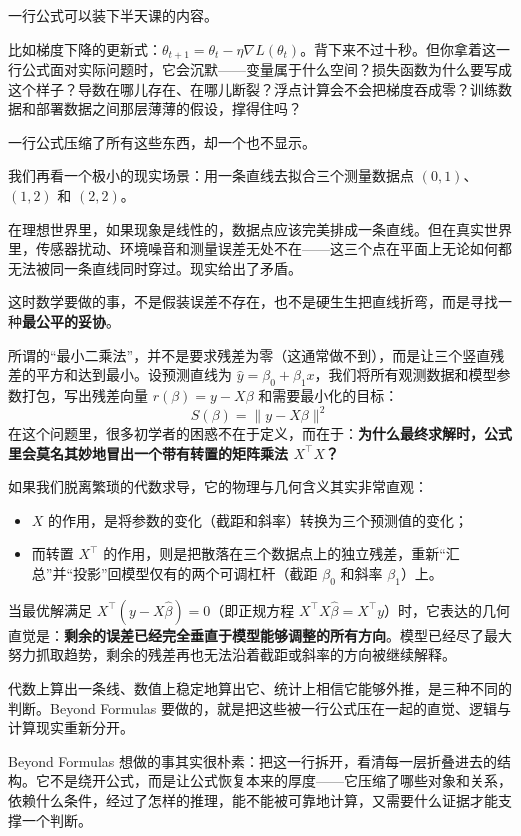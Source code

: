 一行公式可以装下半天课的内容。

比如梯度下降的更新式：$\theta_{t+1}=\theta_t-\eta\nabla L(\theta_t)$。背下来不过十秒。但你拿着这一行公式面对实际问题时，它会沉默——变量属于什么空间？损失函数为什么要写成这个样子？导数在哪儿存在、在哪儿断裂？浮点计算会不会把梯度吞成零？训练数据和部署数据之间那层薄薄的假设，撑得住吗？

一行公式压缩了所有这些东西，却一个也不显示。

我们再看一个极小的现实场景：用一条直线去拟合三个测量数据点 $(0,1)$、$(1,2)$ 和 $(2,2)$。

在理想世界里，如果现象是线性的，数据点应该完美排成一条直线。但在真实世界里，传感器扰动、环境噪音和测量误差无处不在——这三个点在平面上无论如何都无法被同一条直线同时穿过。现实给出了矛盾。

这时数学要做的事，不是假装误差不存在，也不是硬生生把直线折弯，而是寻找一种\textbf{最公平的妥协}。

所谓的“最小二乘法”，并不是要求残差为零（这通常做不到），而是让三个竖直残差的平方和达到最小。设预测直线为 $\hat{y} = \beta_0 + \beta_1 x$，我们将所有观测数据和模型参数打包，写出残差向量 $r(\beta) = y - X\beta$ 和需要最小化的目标：
\[
S(\beta) = \|y - X\beta\|^2
\]
在这个问题里，很多初学者的困惑不在于定义，而在于：\textbf{为什么最终求解时，公式里会莫名其妙地冒出一个带有转置的矩阵乘法 $X^{\top}X$？}

如果我们脱离繁琐的代数求导，它的物理与几何含义其实非常直观：
\begin{itemize}
    \item $X$ 的作用，是将参数的变化（截距和斜率）转换为三个预测值的变化；
    \item 而转置 $X^{\top}$ 的作用，则是把散落在三个数据点上的独立残差，重新“汇总”并“投影”回模型仅有的两个可调杠杆（截距 $\beta_0$ 和斜率 $\beta_1$）上。
\end{itemize}

当最优解满足 $X^{\top}(y - X\hat{\beta}) = 0$（即正规方程 $X^{\top}X\hat{\beta} = X^{\top}y$）时，它表达的几何直觉是：\textbf{剩余的误差已经完全垂直于模型能够调整的所有方向}。模型已经尽了最大努力抓取趋势，剩余的残差再也无法沿着截距或斜率的方向被继续解释。

代数上算出一条线、数值上稳定地算出它、统计上相信它能够外推，是三种不同的判断。Beyond Formulas 要做的，就是把这些被一行公式压在一起的直觉、逻辑与计算现实重新分开。

Beyond Formulas 想做的事其实很朴素：把这一行拆开，看清每一层折叠进去的结构。它不是绕开公式，而是让公式恢复本来的厚度——它压缩了哪些对象和关系，依赖什么条件，经过了怎样的推理，能不能被可靠地计算，又需要什么证据才能支撑一个判断。

